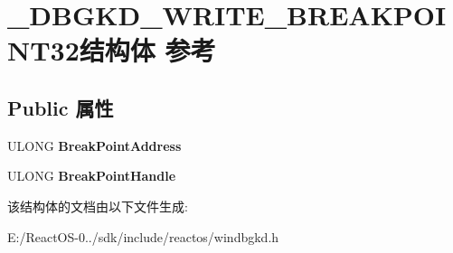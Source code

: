 \hypertarget{struct___d_b_g_k_d___w_r_i_t_e___b_r_e_a_k_p_o_i_n_t32}{}\section{\+\_\+\+D\+B\+G\+K\+D\+\_\+\+W\+R\+I\+T\+E\+\_\+\+B\+R\+E\+A\+K\+P\+O\+I\+N\+T32结构体 参考}
\label{struct___d_b_g_k_d___w_r_i_t_e___b_r_e_a_k_p_o_i_n_t32}
\subsection*{Public 属性}
\begin{DoxyCompactItemize}
\item 
\mbox{\label{struct___d_b_g_k_d___w_r_i_t_e___b_r_e_a_k_p_o_i_n_t32_a6ab62fa181d12525d58e2e08bbfc8005}} 
U\+L\+O\+NG {\bfseries Break\+Point\+Address}
\item 
\mbox{\label{struct___d_b_g_k_d___w_r_i_t_e___b_r_e_a_k_p_o_i_n_t32_a0344cc39d2d4640959ed7b22e2cf3d64}} 
U\+L\+O\+NG {\bfseries Break\+Point\+Handle}
\end{DoxyCompactItemize}


该结构体的文档由以下文件生成\+:\begin{DoxyCompactItemize}
\item 
E\+:/\+React\+O\+S-\/0../sdk/include/reactos/windbgkd.\+h\end{DoxyCompactItemize}
